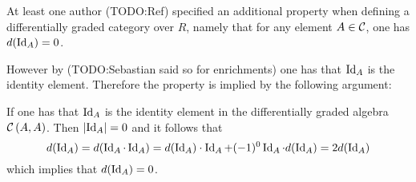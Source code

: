 \begin{remark}
    At least one author (TODO:Ref) specified an additional property when defining a differentially graded category over \( R \), namely that for any element \( A \in {\mathcal{C}} \), one has \( d(\operatorname{Id}_A) = 0 \).

    However by (TODO:Sebastian said so for enrichments) one has that \( \operatorname{Id}_A \) is the identity element. Therefore the property is implied by the following argument:
    
    If one has that \( \operatorname{Id}_A \) is the identity element in the differentially graded algebra \( {\mathcal{C}}\left( A, A \right) \). Then \( \lvert \operatorname{Id}_A \rvert = 0 \) and it follows that
    \[
        d(\operatorname{Id}_A) = d(\operatorname{Id}_A \cdot \operatorname{Id}_A) = d(\operatorname{Id}_A) \cdot \operatorname{Id}_A + (-1)^0 \operatorname{Id}_A \cdot d(\operatorname{Id}_A) = 2d(\operatorname{Id}_A)
    \]
    which implies that \( d(\operatorname{Id}_A) = 0 \).
\end{remark}
